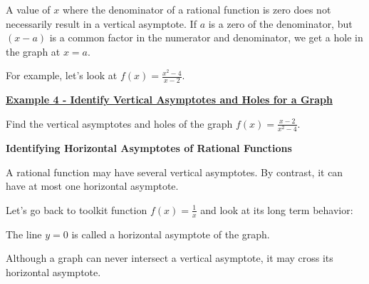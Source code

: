 \documentclass[12pt]{book}
\newcommand{\D}{\displaystyle}
\begin{document}
\newpage

A value of $x$ where the denominator of a rational function is zero does not necessarily result in a vertical asymptote. If $a$ is a zero of the denominator, but $(x-a)$ is a common factor in the numerator and denominator, we get a hole in the graph at $x=a$. 
\vspace{5mm}

For example, let's look at $\D f(x)= \frac{x^2-4}{x-2}$. 

\vspace{70mm}

\underline{\textbf{Example 4 - Identify Vertical Asymptotes and Holes for a Graph}}
\vspace{3mm}

Find the vertical asymptotes and holes of the graph $\D f(x)=\frac{x-2}{x^2-4}$.




\newpage

\textbf{{\large {Identifying Horizontal Asymptotes of Rational Functions}}}

A rational function may have several vertical asymptotes. By contrast, 
it can have at most one horizontal asymptote. 


Let's go back to toolkit function $\D f(x)=\frac{1}{x}$ and look at its long term behavior: 





The line $y=0$ is called a horizontal asymptote of the graph.
\vspace{5mm}

Although a graph can never intersect  a vertical asymptote, it may cross its horizontal asymptote.
\end{document}
